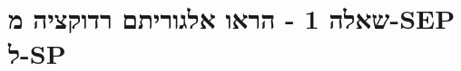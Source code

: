 \documentclass[luatex]{beamer}
\newcommand{\E}[1]{\foreignlanguage{english}{\fontspec{Open Sans}#1}}
\begin{document}
\section{שאלה 1 -  הראו אלגוריתם רדוקציה מ-SEP ל-SP }
%
%
%
%	
%	
%
\end{document}
